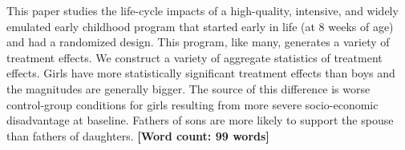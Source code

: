 \noindent This paper studies the life-cycle impacts of a high-quality, intensive, and widely emulated early childhood program that started early in life (at 8 weeks of age) and had a randomized design. This program, like many, generates a variety of treatment effects. We construct a variety of aggregate statistics of treatment effects. Girls have more statistically significant treatment effects than boys and the magnitudes are generally bigger. The source of this difference is worse control-group conditions for girls resulting from more severe socio-economic disadvantage at baseline. Fathers of sons are more likely to support the spouse than fathers of daughters. \textbf{[Word count: 99 words]}
